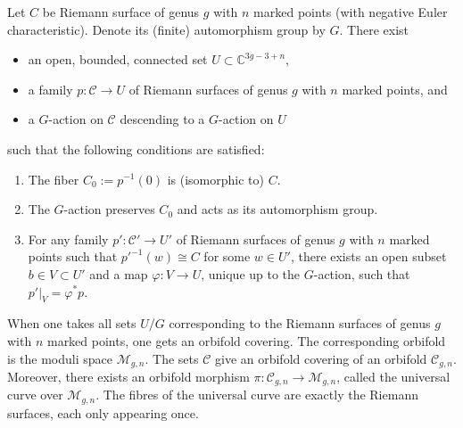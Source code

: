    \begin{property}
        Let $C$ be Riemann surface of genus $g$ with $n$ marked points (with negative Euler characteristic). Denote its (finite) automorphism group by $G$. There exist
        \begin{itemize}
            \item an open, bounded, connected set $U\subset\mathbb{C}^{3g-3+n}$,
            \item a family $p:\mathcal{C}\rightarrow U$ of Riemann surfaces of genus $g$ with $n$ marked points, and
            \item a $G$-action on $\mathcal{C}$ descending to a $G$-action on $U$
        \end{itemize}
        such that the following conditions are satisfied:
        \begin{enumerate}
            \item The fiber $C_0:=p^{-1}(0)$ is (isomorphic to) $C$.
            \item The $G$-action preserves $C_0$ and acts as its automorphism group.
            \item For any family $p':\mathcal{C}'\rightarrow U'$ of Riemann surfaces of genus $g$ with $n$ marked points such that $p'^{-1}(w)\cong C$ for some $w\in U'$, there exists an open subset $b\in V\subset U'$ and a map $\varphi:V\rightarrow U$, unique up to the $G$-action, such that $p'|_V=\varphi^*p$.
        \end{enumerate}

        When one takes all sets $U/G$ corresponding to the Riemann surfaces of genus $g$ with $n$ marked points, one gets an orbifold covering. The corresponding orbifold is the moduli space $\mathcal{M}_{g,n}$. The sets $\mathcal{C}$ give an orbifold covering of an orbifold $\mathcal{C}_{g,n}$. Moreover, there exists an orbifold morphism $\pi:\mathcal{C}_{g,n}\rightarrow\mathcal{M}_{g,n}$, called the universal curve over $\mathcal{M}_{g,n}$. The fibres of the universal curve are exactly the Riemann surfaces, each only appearing once.
    \end{property}

